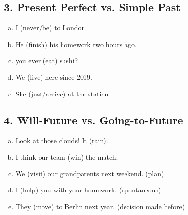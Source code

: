 \subsection*{3. Present Perfect vs. Simple Past}
\begin{enumerate}[a)]
    \item I \underline{\hspace{2cm}} (never/be) to London.
    \item He \underline{\hspace{2cm}} (finish) his homework two hours ago.
    \item \underline{\hspace{2cm}} you ever \underline{\hspace{2cm}} (eat) sushi?
    \item We \underline{\hspace{2cm}} (live) here since 2019.
    \item She \underline{\hspace{2cm}} (just/arrive) at the station.
\end{enumerate}

\subsection*{4. Will-Future vs. Going-to-Future}
\begin{enumerate}[a)]
    \item Look at those clouds! It \underline{\hspace{2cm}} (rain).
    \item I think our team \underline{\hspace{2cm}} (win) the match.
    \item We \underline{\hspace{2cm}} (visit) our grandparents next weekend. (plan)
    \item I \underline{\hspace{2cm}} (help) you with your homework. (spontaneous)
    \item They \underline{\hspace{2cm}} (move) to Berlin next year. (decision made before)
\end{enumerate}

